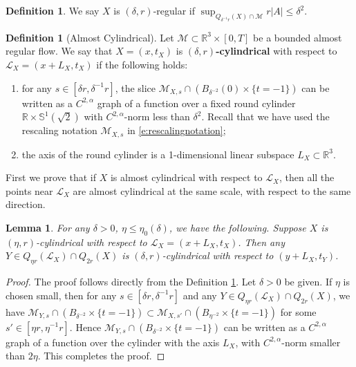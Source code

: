 \documentclass[11pt,reqno]{amsart}
\numberwithin{equation}{section}
\newcommand{\RR}{\mathds{R}}
\newcommand{\cL}{\mathcal{L}}
\newcommand{\cM}{\mathcal{M}}
\newtheorem{lemma}[equation]{Lemma}
\theoremstyle{definition}
\newtheorem{definition}[equation]{Definition}
\theoremstyle{remark}
\theoremstyle{remark}
\theoremstyle{remark}
\theoremstyle{remark}\newtheorem{conjecture}[equation]{Conjecture}
\theoremstyle{remark}\newtheorem{question}[equation]{Question}
\begin{document}
\begin{definition}
    We say $X$ is $(\delta,r)$-regular if $\sup_{Q_{\delta^{-1} r}(X) \cap \cM} r|A| \le \delta^2$.
\end{definition}




\begin{definition}[Almost Cylindrical]\label{d:almost cylindrical}
    Let $\cM \subset \RR^3 \times [0,T]$ be a bounded almost regular flow. We say that $X=(x,t_X)$ is \textbf{$(\delta,r)$-cylindrical} with respect to $\cL_X =  (x + L_X, t_X)$ if the following holds: 
    \begin{enumerate}
        \item for any $s \in [\delta r, \delta^{-1} r]$, the slice $\cM_{X,s} \cap (B_{\delta^{-2}}(0) \times\{t = -1\})$ can be written as a $C^{2,\alpha}$ graph of a function over a fixed round cylinder $\RR \times \mathds{S}^1(\sqrt{2})$ with $C^{2,\alpha}$-norm less than $\delta^2$. Recall that we have used the rescaling notation $\cM_{X,s}$ in \eqref{e:rescalingnotation};
        \item the axis of the round cylinder is a 1-dimensional linear subspace $L_X \subset \RR^3$. 
    \end{enumerate}
\end{definition}


First we prove that if $X$ is almost cylindrical with respect to $\cL_X$, then all the points near $\cL_X$ are almost cylindrical at the same scale, with respect to the same direction.

\begin{lemma}\label{l:near cylindrical also cylindrical}
    For any $\delta>0$, $\eta\le \eta_0(\delta)$, we have the following. Suppose $X$ is $(\eta,r)$-cylindrical with respect to $\cL_X = (x+L_X,t_X)$. Then any $Y \in Q_{\eta r}(\cL_X) \cap Q_{2r}(X)$ is $(\delta,r)$-cylindrical with respect to $(y+L_X, t_Y)$.  
\end{lemma}

\begin{proof}
    The proof follows directly from the Definition \ref{d:almost cylindrical}. Let $\delta>0$ be given. If $\eta$ is chosen small, then for any $s\in [\delta r, \delta^{-1}r]$ and any $Y \in Q_{\eta r}(\cL_X) \cap Q_{2r}(X)$, we have $\cM_{Y,s}\cap (B_{\delta^{-2}}\times \{t=-1\} ) \subset \cM_{X,s'}\cap (B_{\eta^{-2}} \times \{t=-1\})$ for some $s' \in [\eta r,\eta^{-1}r]$. Hence $\cM_{Y,s}\cap(B_{\delta^{-2}}\times \{t=-1\} ) $ can be written as a $C^{2,\alpha}$ graph of a function over the cylinder with the axis $L_X$, with $C^{2,\alpha}$-norm smaller than $2\eta$. This completes the proof.
\end{proof}
\end{document}
